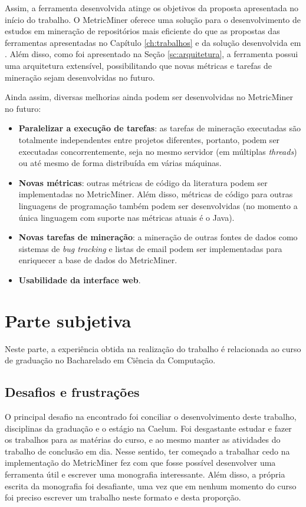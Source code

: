 \documentclass[a4paper, 12pt, twoside]{book}
\begin{document}
        Assim, a ferramenta desenvolvida atinge os objetivos da proposta apresentada no início do trabalho. O MetricMiner oferece uma solução para o desenvolvimento de estudos em mineração de repositórios mais eficiente do que as propostas das ferramentas apresentadas no Capítulo \ref{ch:trabalhos} e da solução desenvolvida em \cite{SoetensQUATIC2010}. Além disso, como foi apresentado na Seção \ref{sc:arquitetura}, a ferramenta possui uma arquitetura extensível, possibilitando que novas métricas e tarefas de mineração sejam desenvolvidas no futuro.

        Ainda assim, diversas melhorias ainda podem ser desenvolvidas no MetricMiner no futuro:
        \begin{itemize}
            \item {\bf Paralelizar a execução de tarefas}: as tarefas de mineração executadas são totalmente independentes entre projetos diferentes, portanto, podem ser executadas concorrentemente, seja no mesmo servidor (em múltiplas \textit{threads}) ou até mesmo de forma distribuída em várias máquinas.
            \item {\bf Novas métricas}: outras métricas de código da literatura podem ser implementadas no MetricMiner. Além disso, métricas de código para outras linguagens de programação também podem ser desenvolvidas (no momento a única linguagem com suporte nas métricas atuais é o Java).
            \item {\bf Novas tarefas de mineração}: a mineração de outras fontes de dados como sistemas de \textit{bug tracking} e listas de email podem ser implementadas para enriquecer a base de dados do MetricMiner.
            \item {\bf Usabilidade da interface web}.
        \end{itemize}


\chapter{Parte subjetiva} \label{ch:subjetiva}

Neste parte, a experiência obtida na realização do trabalho é relacionada ao curso de graduação no Bacharelado em Ciência da Computação.

    \section{Desafios e frustrações}
    O principal desafio na encontrado foi conciliar o desenvolvimento deste trabalho, disciplinas da graduação e o estágio na Caelum. Foi desgastante estudar e fazer os trabalhos para as matérias do curso,  e ao mesmo manter as atividades do trabalho de conclusão em dia. Nesse sentido, ter começado a trabalhar cedo na implementação do MetricMiner fez com que fosse possível desenvolver uma ferramenta útil e escrever uma monografia interessante. Além disso, a própria escrita da monografia foi desafiante, uma vez que em nenhum momento do curso foi preciso escrever um trabalho neste formato e desta proporção.
\end{document}
